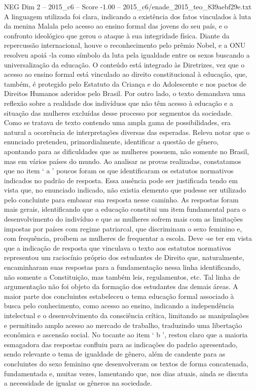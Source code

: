 \begin{textsample}{NEG Dim 2 – 2015\_c6 – Score -1.00 – 2015\_c6/enade\_2015\_teo\_839aebf29e.txt}
A linguagem utilizada foi clara, indicando a existência dos fatos vinculados à luta da menina Malala pelo acesso ao ensino formal das jovens do seu país, e o confronto ideológico que gerou o ataque à sua integridade física.
Diante da repercussão internacional, houve o reconhecimento pelo prêmio Nobel, e a ONU resolveu apoiá -la como símbolo da luta pela igualdade entre os sexos buscando a universalização da educação.
O conteúdo está integrado às Diretrizes, vez que o acesso ao ensino formal está vinculado ao direito constitucional à educação, que, também, é protegido pelo Estatuto da Criança e do Adolescente e nos pactos de Direitos Humanos aderidos pelo Brasil.
Por outro lado, o texto demandava uma reflexão sobre a realidade dos indivíduos que não têm acesso à educação e a situação das mulheres excluídas desse processo por segmentos da sociedade.
Como se tratava de texto contendo uma ampla gama de possibilidades, era natural a ocorrência de interpretações diversas das esperadas.
Releva notar que o enunciado pretendeu, primordialmente, identificar a questão de gênero, apontando para as dificuldades que as mulheres possuem, não somente no Brasil, mas em vários países do mundo.
Ao analisar as provas realizadas, constatamos que no item ‘ a ’ poucos foram os que identificaram os estatutos normativos indicados no padrão de resposta.
Essa ausência pode ser justificada tendo em vista que, no enunciado indicado, não existia elemento que pudesse ser utilizado pelo concluinte para embasar sua resposta nesse caminho.
As respostas foram mais gerais, identificando que a educação constitui um item fundamental para o desenvolvimento do indivíduo e que as mulheres sofrem mais com as limitações impostas por países com regime patriarcal, que discriminam o sexo feminino e, com frequência, proíbem as mulheres de frequentar a escola.
Deve -se ter em vista que a indicação de resposta que vinculava o texto aos estatutos normativos representou um raciocínio próprio dos estudantes de Direito que, naturalmente, encaminharam suas respostas para a fundamentação nessa linha identificando, não somente a Constituição, mas também leis, regulamentos, etc.
Tal linha de argumentação não foi objeto da formação dos estudantes das demais áreas.
A maior parte dos concluintes estabeleceu o tema educação formal associado à busca pelo conhecimento, como acesso ao ensino, indicando a independência intelectual e o desenvolvimento da consciência crítica, limitando as manipulações e permitindo amplo acesso ao mercado de trabalho, traduzindo uma libertação econômica e ascensão social.
No tocante ao item ‘ b ’, restou claro que a maioria esmagadora das respostas confluiu para as indicações do padrão apresentado, sendo relevante o tema de igualdade de gênero, além de candente para as concluintes do sexo feminino que desenvolveram os textos de forma concatenada, fundamentada e, muitas vezes, lamentando que, nos dias atuais, ainda se discuta a necessidade de igualar os gêneros na sociedade.

\end{textsample}
